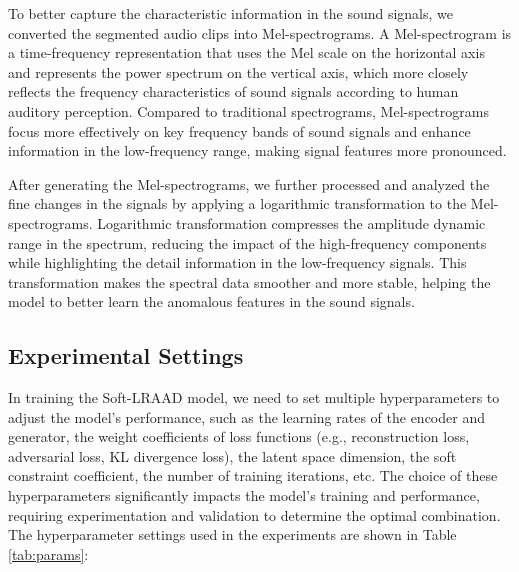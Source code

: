 \documentclass{article}
\begin{document}
To better capture the characteristic information in the sound signals, we converted the segmented audio clips into Mel-spectrograms. A Mel-spectrogram is a time-frequency representation that uses the Mel scale on the horizontal axis and represents the power spectrum on the vertical axis, which more closely reflects the frequency characteristics of sound signals according to human auditory perception. Compared to traditional spectrograms, Mel-spectrograms focus more effectively on key frequency bands of sound signals and enhance information in the low-frequency range, making signal features more pronounced.

After generating the Mel-spectrograms, we further processed and analyzed the fine changes in the signals by applying a logarithmic transformation to the Mel-spectrograms. Logarithmic transformation compresses the amplitude dynamic range in the spectrum, reducing the impact of the high-frequency components while highlighting the detail information in the low-frequency signals. This transformation makes the spectral data smoother and more stable, helping the model to better learn the anomalous features in the sound signals.

\subsection{Experimental Settings}

In training the Soft-LRAAD model, we need to set multiple hyperparameters to adjust the model's performance, such as the learning rates of the encoder and generator, the weight coefficients of loss functions (e.g., reconstruction loss, adversarial loss, KL divergence loss), the latent space dimension, the soft constraint coefficient, the number of training iterations, etc. The choice of these hyperparameters significantly impacts the model's training and performance, requiring experimentation and validation to determine the optimal combination. The hyperparameter settings used in the experiments are shown in Table \ref{tab:params}:
\end{document}
